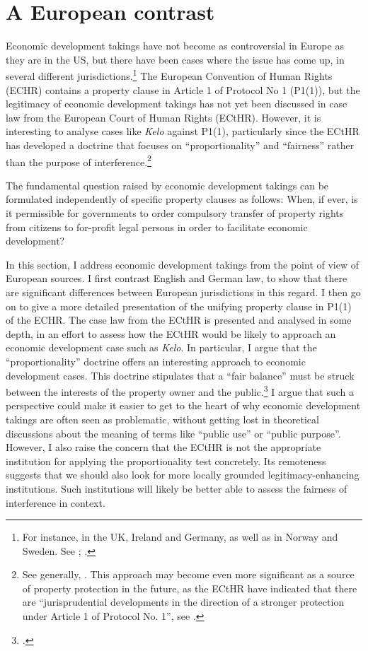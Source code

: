 \section{A European contrast}

Economic development takings have not become as controversial in Europe as they are in the US, but there have been cases where the issue has come up, in several different jurisdictions.\footnote{For instance, in the UK, Ireland and Germany, as well as in Norway and Sweden. See \cite[466-483]{walt11}; \cite{stenseth10}.} The European Convention of Human Rights (ECHR) contains a property clause in Article 1 of Protocol No 1 (P1(1)), but the legitimacy of economic development takings has not yet been discussed in case law from the European Court of Human Rights (ECtHR). However, it is interesting to analyse cases like {\it Kelo} against P1(1), particularly since the ECtHR has developed a doctrine that focuses on ``proportionality'' and ``fairness'' rather than the purpose of interference.\footnote{See generally, \cite[Chapter 5]{allen05}. This approach may become even more significant as a source of property protection in the future, as the ECtHR have indicated that there are ``jurisprudential developments in the direction of a stronger protection under Article 1 of Protocol No. 1'', see \cite[135]{lindheim12}.}

The fundamental question raised by economic development takings can be formulated independently of specific property clauses as follows: When, if ever, is it permissible for governments to order compulsory transfer of property rights from citizens to for-profit legal persons in order to facilitate economic development?

In this section, I address economic development takings from the point of view of European sources. I first contrast English and German law, to show that there are significant differences between European jurisdictions in this regard. I then go on to give a more detailed presentation of the unifying property clause in P1(1) of the ECHR. The case law from the ECtHR is presented and analysed in some depth, in an effort to assess how the ECtHR would be likely to approach an economic development case such as {\it Kelo}. In particular, I argue that the ``proportionality'' doctrine offers an interesting approach to economic development cases. This doctrine stipulates that a ``fair balance'' must be struck  between the interests of the property owner and the public.\footcite[Chapter 5]{allen05} I argue that such a perspective could make it easier to get to the heart of why economic development takings are often seen as problematic, without getting lost in theoretical discussions about the meaning of  terms like ``public use'' or ``public purpose''. However, I also raise the concern that the ECtHR is not the appropriate institution for applying the proportionality test concretely. Its remoteness suggests that we should also look for more locally grounded legitimacy-enhancing institutions. Such institutions will likely be better able to assess the fairness of interference in context.

